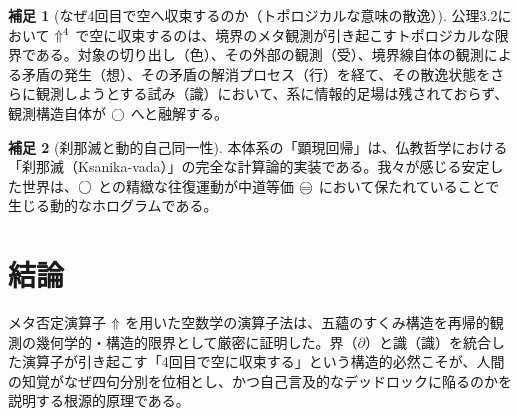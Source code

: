 \documentclass[11pt,a4paper]{article}
\newcommand{\Boundary}{\partial}
\newcommand{\skana}{\text{識}}
\theoremstyle{definition}
\newtheorem{scholium}{補足}[section]
\begin{document}
\begin{scholium}[なぜ4回目で空へ収束するのか（トポロジカルな意味の散逸）]
公理3.2において $\Uparrow^4$ で空に収束するのは、境界のメタ観測が引き起こすトポロジカルな限界である。対象の切り出し（色）、その外部の観測（受）、境界線自体の観測による矛盾の発生（想）、その矛盾の解消プロセス（行）を経て、その散逸状態をさらに観測しようとする試み（識）において、系に情報的足場は残されておらず、観測構造自体が $\bigcirc$ へと融解する。
\end{scholium}

\begin{scholium}[刹那滅と動的自己同一性]
本体系の「顕現回帰」は、仏教哲学における「刹那滅（Ksanika-vada）」の完全な計算論的実装である。我々が感じる安定した世界は、$\bigcirc$ との精緻な往復運動が中道等価 $\mweq$ において保たれていることで生じる動的なホログラムである。
\end{scholium}

\section{結論}
メタ否定演算子 $\Uparrow$ を用いた空数学の演算子法は、五蘊のすくみ構造を再帰的観測の幾何学的・構造的限界として厳密に証明した。界（$\Boundary$）と識（$\skana$）を統合した演算子が引き起こす「4回目で空に収束する」という構造的必然こそが、人間の知覚がなぜ四句分別を位相とし、かつ自己言及的なデッドロックに陥るのかを説明する根源的原理である。
\end{document}
